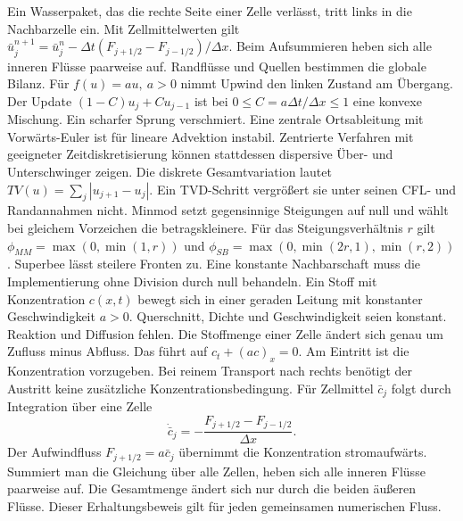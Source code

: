 \hypertarget{punkt7-3-1}{}
Ein Wasserpaket, das die rechte Seite einer Zelle verlässt, tritt links in die Nachbarzelle ein. Mit Zellmittelwerten gilt \(\bar u_j^{n+1}=\bar u_j^n-\Delta t(F_{j+1/2}-F_{j-1/2})/\Delta x\). Beim Aufsummieren heben sich alle inneren Flüsse paarweise auf. Randflüsse und Quellen bestimmen die globale Bilanz.
\hypertarget{punkt7-3-2}{}
Für \(f(u)=au,\ a>0\) nimmt Upwind den linken Zustand am Übergang. Der Update \((1-C)u_j+Cu_{j-1}\) ist bei \(0\le C=a\Delta t/\Delta x\le1\) eine konvexe Mischung. Ein scharfer Sprung verschmiert. Eine zentrale Ortsableitung mit Vorwärts-Euler ist für lineare Advektion instabil. Zentrierte Verfahren mit geeigneter Zeitdiskretisierung können stattdessen dispersive Über- und Unterschwinger zeigen.
\hypertarget{punkt7-3-3}{}
Die diskrete Gesamtvariation lautet \(TV(u)=\sum_j|u_{j+1}-u_j|\). Ein TVD-Schritt vergrößert sie unter seinen CFL- und Randannahmen nicht. Minmod setzt gegensinnige Steigungen auf null und wählt bei gleichem Vorzeichen die betragskleinere. Für das Steigungsverhältnis \(r\) gilt \(\phi_{MM}=\max(0,\min(1,r))\) und \(\phi_{SB}=\max(0,\min(2r,1),\min(r,2))\). Superbee lässt steilere Fronten zu. Eine konstante Nachbarschaft muss die Implementierung ohne Division durch null behandeln.
Ein Stoff mit Konzentration \(c(x,t)\) bewegt sich in einer geraden Leitung mit konstanter Geschwindigkeit \(a>0\). Querschnitt, Dichte und Geschwindigkeit seien konstant. Reaktion und Diffusion fehlen. Die Stoffmenge einer Zelle ändert sich genau um Zufluss minus Abfluss. Das führt auf \(c_t+(ac)_x=0\). Am Eintritt ist die Konzentration vorzugeben. Bei reinem Transport nach rechts benötigt der Austritt keine zusätzliche Konzentrationsbedingung.
Für Zellmittel \(\bar c_j\) folgt durch Integration über eine Zelle
\[
 \dot{\bar c}_j=-\frac{F_{j+1/2}-F_{j-1/2}}{\Delta x}.
\]
Der Aufwindfluss \(F_{j+1/2}=a\bar c_j\) übernimmt die Konzentration stromaufwärts. Summiert man die Gleichung über alle Zellen, heben sich alle inneren Flüsse paarweise auf. Die Gesamtmenge ändert sich nur durch die beiden äußeren Flüsse. Dieser Erhaltungsbeweis gilt für jeden gemeinsamen numerischen Fluss.

